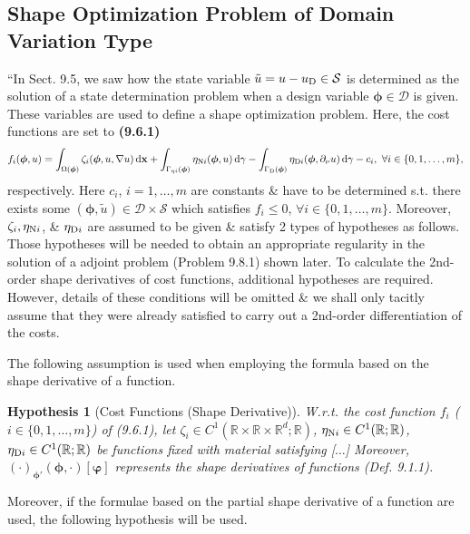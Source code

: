 \documentclass[oneside]{book}
\numberwithin{equation}{section}
\newtheorem{hypothesis}{Hypothesis}[chapter]
\begin{document}
\subsection{Shape Optimization Problem of Domain Variation Type}
``In Sect. 9.5, we saw how the state variable $\tilde{u} = u - u_{\rm D}\in\mathcal{S}$ is determined as the solution of a state determination problem when a design variable $\boldsymbol{\phi}\in\mathcal{D}$ is given. These variables are used to define a shape optimization problem. Here, the cost functions are set to \textbf{(9.6.1)}
\begin{align*}
	f_i(\boldsymbol{\phi},u) = \int_{\Omega(\boldsymbol{\phi})} \zeta_i(\boldsymbol{\phi},u,\nabla u)\,{\rm d}{\bf x} + \int_{\Gamma_{\eta i}(\boldsymbol{\phi})} \eta_{{\rm N}i}(\boldsymbol{\phi},u)\,{\rm d}\gamma - \int_{\Gamma_{\rm D}(\boldsymbol{\phi})} \eta_{{\rm D}i}(\boldsymbol{\phi},\partial_\nu u)\,{\rm d}\gamma - c_i,\ \forall i\in\{0,1,\ldots,m\},
\end{align*}
respectively. Here $c_i$, $i = 1,\ldots,m$ are constants \& have to be determined s.t. there exists some $(\boldsymbol{\phi},\tilde{u})\in\mathcal{D}\times\mathcal{S}$ which satisfies $f_i\le 0$, $\forall i\in\{0,1,\ldots,m\}$. Moreover, $\zeta_i,\eta_{{\rm N}i}$, \& $\eta_{{\rm D}i}$ are assumed to be given \& satisfy 2 types of hypotheses as follows. Those hypotheses will be needed to obtain an appropriate regularity in the solution of a adjoint problem (Problem 9.8.1) shown later. To calculate the 2nd-order shape derivatives of cost functions, additional hypotheses are required. However, details of these conditions will be omitted \& we shall only tacitly assume that they were already satisfied to carry out a 2nd-order differentiation of the costs.

The following assumption is used when employing the formula based on the shape derivative of a function.

\begin{hypothesis}[Cost Functions (Shape Derivative)]
	W.r.t. the cost function $f_i$ ($i\in\{0,1,\ldots,m\}$) of (9.6.1), let $\zeta_i\in C^1(\mathbb{R}\times\mathbb{R}\times\mathbb{R}^d;\mathbb{R})$, $\eta_{{\rm N}i}\in C^1(\mathbb{R};\mathbb{R})$, $\eta_{{\rm D}i}\in C^1(\mathbb{R};\mathbb{R})$ be functions fixed with material satisfying [$\ldots$] Moreover, $(\cdot)_{\boldsymbol{\phi}'}(\boldsymbol{\phi},\cdot)[\boldsymbol{\varphi}]$ represents the shape derivatives of functions (Def. 9.1.1).
\end{hypothesis}
Moreover, if the formulae based on the partial shape derivative of a function are used, the following hypothesis will be used.
\end{document}
